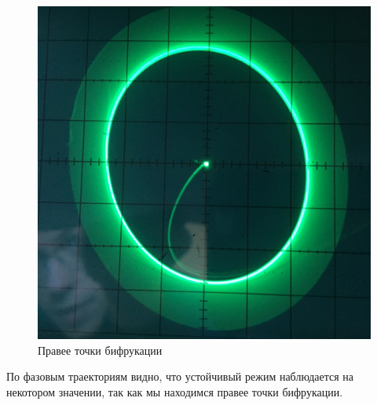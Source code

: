 \begin{figure}[h]
\begin{minipage}{0.32\linewidth}
	\end{minipage}
	\begin{minipage}{0.32\linewidth}
	\includegraphics[width=\linewidth]{photo/task1b(rightL).jpg}
	\end{minipage}
	\caption{Правее точки бифрукации}
	\label{fig4}
\end{figure}
По фазовым траекториям видно, что устойчивый режим наблюдается на некотором значении, так как мы находимся правее точки бифрукации.
